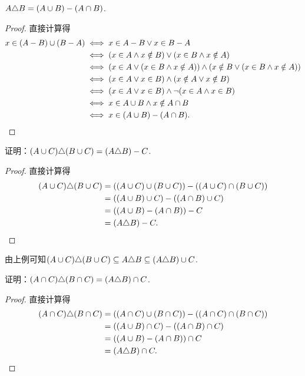 \begin{theorem}
\(A \triangle B = (A \cup B)-(A \cap B)\).
\begin{proof}
直接计算得
\begin{align*}
	x\in(A-B)\cup(B-A)
	&\iff x \in A-B \lor x \in B-A \\
	&\iff (x \in A \land x \notin B) \lor (x \in B \land x \notin A) \\
	&\iff (x \in A \lor (x \in B \land x \notin A)) \land (x \notin B \lor (x \in B \land x \notin A)) \\
	&\iff (x \in A \lor x \in B) \land (x \notin A \lor x \notin B) \\
	&\iff (x \in A \lor x \in B) \land \neg(x \in A \land x \in B) \\
	&\iff x \in A \cup B \land x \notin A \cap B \\
	&\iff x\in(A \cup B)-(A \cap B).
	\qedhere
\end{align*}
\end{proof}
\end{theorem}

\begin{example}
证明：\((A \cup C) \triangle (B \cup C) = (A \triangle B) - C\).
\begin{proof}
直接计算得\begin{align*}
	(A \cup C) \triangle (B \cup C)
	&= ((A \cup C) \cup (B \cup C)) - ((A \cup C) \cap (B \cup C)) \\
	&= ((A \cup B) \cup C) - ((A \cap B) \cup C) \\
	&= ((A \cup B) - (A \cap B)) - C \\
	&= (A \triangle B) - C.
	\qedhere
\end{align*}
\end{proof}
\end{example}
\begin{remark}
由上例可知\(
	(A \cup C) \triangle (B \cup C)
	\subseteq
	A \triangle B
	\subseteq
	(A \triangle B) \cup C
\).
\end{remark}

\begin{example}
证明：\((A \cap C) \triangle (B \cap C) = (A \triangle B) \cap C\).
\begin{proof}
直接计算得\begin{align*}
	(A \cap C) \triangle (B \cap C)
	&= ((A \cap C) \cup (B \cap C)) - ((A \cap C) \cap (B \cap C)) \\
	&= ((A \cup B) \cap C) - ((A \cap B) \cap C) \\
	&= ((A \cup B) - (A \cap B)) \cap C \\
	&= (A \triangle B) \cap C.
	\qedhere
\end{align*}
\end{proof}
\end{example}


